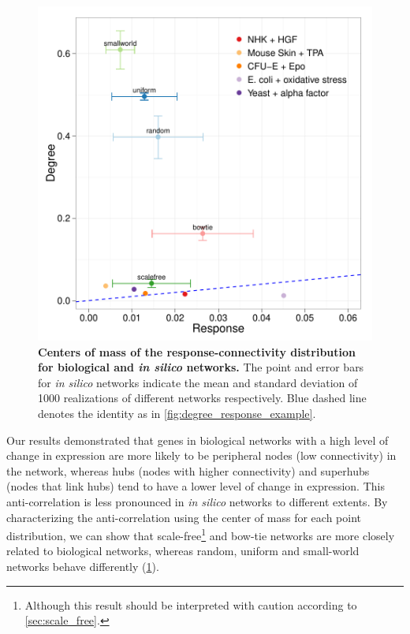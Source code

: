 \begin{figure}[!ht]
\begin{center}
\includegraphics[width=\textwidth]{degree_response-summary.pdf}
\end{center}
\caption[Comparison between biological and \emph{in silico} networks]{
{\bf Centers of mass of the response-connectivity distribution for biological
and \emph{in silico} networks.} 
The point and error bars for \emph{in silico} networks indicate the mean
and standard deviation of 1000 realizations of different networks respectively.
Blue dashed line denotes the identity as in \ref{fig:degree_response_example}.
}
\label{fig:degree_response_summary}
\end{figure}

Our results demonstrated that genes in biological networks with a high level 
of change in expression are more likely to be peripheral nodes 
(low connectivity) in the network, whereas hubs (nodes with higher 
connectivity) and superhubs (nodes that link hubs) tend to have a lower level 
of change in expression. This anti-correlation is less pronounced in 
\emph{in silico} networks to different extents. By characterizing the 
anti-correlation using the center of mass for each point distribution, we
can show that scale-free\footnote{Although this result should be interpreted 
with caution according to \ref{sec:scale_free}.} and bow-tie networks are more closely related to
biological networks, whereas random, uniform and small-world networks behave
differently (\ref{fig:degree_response_summary}).


